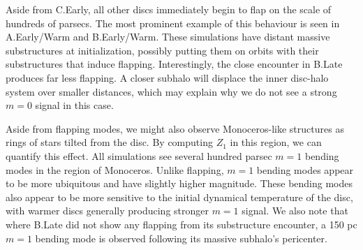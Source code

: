 Aside from C.Early, all other discs immediately begin to flap on the scale of hundreds of parsecs. The most prominent example of this behaviour is seen in A.Early/Warm and B.Early/Warm. These simulations have distant massive substructures at initialization, possibly putting them on orbits with their substructures that induce flapping. Interestingly, the close encounter in B.Late produces far less flapping. A closer subhalo will displace the inner disc-halo system over smaller distances, which may explain why we do not see a strong $m=0$ signal in this case.

Aside from flapping modes, we might also observe Monoceros-like structures as rings of stars tilted from the disc. By computing $Z_1$ in this region, we can quantify this effect. All simulations see several hundred parsec $m=1$ bending modes in the region of Monoceros. Unlike flapping, $m=1$ bending modes appear to be more ubiquitous and have slightly higher magnitude. These bending modes also appear to be more sensitive to the initial dynamical temperature of the disc, with warmer discs generally producing stronger $m=1$ signal. We also note that where B.Late did not show any flapping from its substructure encounter, a 150 pc $m=1$ bending mode is observed following its massive subhalo's pericenter.


